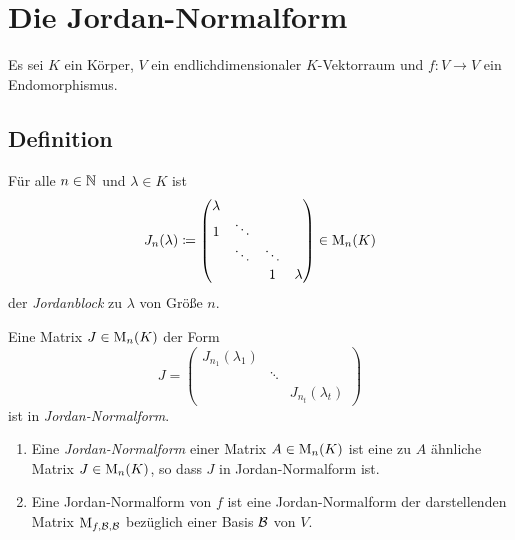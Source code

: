 \chapter{Die Jordan-Normalform}

Es sei $K$ ein Körper, $V$ ein endlichdimensionaler $K$-Vektorraum und $f \colon V \to V$ ein Endomorphismus.





\section{Definition}

\begin{definition}
  Für alle $n \in \mathbb{N}$ und $\lambda \in K$ ist
  \[
              J_n(\lambda)
    \coloneqq \begin{pmatrix}
                \lambda &         &         &         \\
                1       & \ddots  &         &         \\
                        & \ddots  & \ddots  &         \\
                        &         & 1       & \lambda
              \end{pmatrix}
    \in       \operatorname{M}_{n}(K)
  \]
  der \emph{Jordanblock} zu $\lambda$ von Größe $n$.
\end{definition}

\begin{definition}
  Eine Matrix $J \in \operatorname{M}_{n}(K)$ der Form
  \[
      J
    = \begin{pmatrix}
        J_{n_1}(\lambda_1)  &         &                     \\
                            & \ddots  &                     \\
                            &         & J_{n_t}(\lambda_t)
      \end{pmatrix}
  \]
  ist in \emph{Jordan-Normalform}.
\end{definition}

\begin{definition}
  \leavevmode
  \begin{enumerate}
    \item
      Eine \emph{Jordan-Normalform} einer Matrix $A \in \operatorname{M}_{n}(K)$ ist eine zu $A$ ähnliche Matrix $J \in \operatorname{M}_{n}(K)$, so dass $J$ in Jordan-Normalform ist.
    \item
      Eine Jordan-Normalform von $f$ ist eine Jordan-Normalform der darstellenden Matrix $\operatorname{M}_{f, \mathcal{B}, \mathcal{B}}$ bezüglich einer Basis $\mathcal{B}$ von $V$.
  \end{enumerate}
\end{definition}


